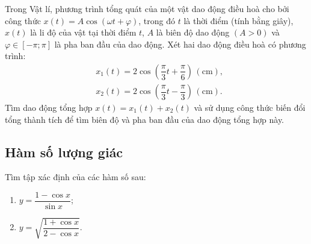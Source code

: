 \begin{bt}%
	Trong Vật lí, phương trình tổng quát của một vật dao động điều hoà cho bởi công thức $x(t)=A \cos (\omega t+\varphi)$, trong đó $t$ là thời điểm (tính bằng giây), $x(t)$ là li độ của vật tại thời điểm $t$, $A$ là biên độ dao động $(A>0)$ và $\varphi \in[-\pi ; \pi]$ là pha ban đầu của dao động. Xét hai dao động điều hoà có phương trình:
	$$
		\begin{aligned}
			 & x_1(t)=2 \cos \left(\dfrac{\pi}{3} t+\dfrac{\pi}{6}\right)\,(\mathrm{cm}),  \\
			 & x_2(t)=2 \cos \left(\dfrac{\pi}{3} t-\dfrac{\pi}{3}\right)\,(\mathrm{cm}) .
		\end{aligned}
	$$
	Tìm dao động tổng hợp $x(t)=x_1(t)+x_2(t)$ và sử dụng công thức biến đổi tổng thành tích để tìm biên độ và pha ban đầu của dao động tổng hợp này.
\end{bt}
\subsection{Hàm số lượng giác}
\begin{bt}%
	Tìm tập xác định của các hàm số sau:
	\begin{multicols}{2}
		\begin{enumerate}
			\item  $y=\dfrac{1-\cos x}{\sin x}$;
			\item  $y=\sqrt{\dfrac{1+\cos x}{2-\cos x}}$.
		\end{enumerate}
	\end{multicols}
\end{bt}

